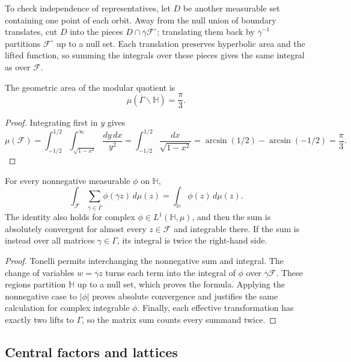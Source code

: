 To check independence of representatives, let $D$ be another measurable set containing one point of each orbit. Away from the null union of boundary translates, cut $D$ into the pieces $D\cap\overline\gamma\mathcal F^\circ$; translating them back by $\overline\gamma^{-1}$ partitions $\mathcal F^\circ$ up to a null set. Each translation preserves hyperbolic area and the lifted function, so summing the integrals over these pieces gives the same integral as over $\mathcal F$.

\begin{proposition}\label{modular.quotient-area}
The geometric area of the modular quotient is
\[
 \mu(\overline\Gamma\backslash\mathbb H)=\frac\pi3.
\]
\end{proposition}

\begin{proof}
Integrating first in $y$ gives
\[
 \mu(\mathcal F)=\int_{-1/2}^{1/2}\int_{\sqrt{1-x^2}}^\infty
       \frac{dy\,dx}{y^2}
 =\int_{-1/2}^{1/2}\frac{dx}{\sqrt{1-x^2}}
 =\arcsin(1/2)-\arcsin(-1/2)=\frac\pi3.
\]
\end{proof}

\begin{proposition}\label{modular.area-unfolding}
For every nonnegative measurable $\phi$ on $\mathbb H$,
\[
 \int_{\mathcal F}\sum_{\overline\gamma\in\overline\Gamma}
       \phi(\overline\gamma z)\,d\mu(z)
 =\int_{\mathbb H}\phi(z)\,d\mu(z).
\]
The identity also holds for complex $\phi\in L^1(\mathbb H,\mu)$, and then the sum is absolutely convergent for almost every $z\in\mathcal F$ and integrable there. If the sum is instead over all matrices $\gamma\in\Gamma$, its integral is twice the right-hand side.
\end{proposition}

\begin{proof}
Tonelli permits interchanging the nonnegative sum and integral. The change of variables $w=\overline\gamma z$ turns each term into the integral of $\phi$ over $\overline\gamma\mathcal F$. These regions partition $\mathbb H$ up to a null set, which proves the formula. Applying the nonnegative case to $|\phi|$ proves absolute convergence and justifies the same calculation for complex integrable $\phi$. Finally, each effective transformation has exactly two lifts to $\Gamma$, so the matrix sum counts every summand twice.
\end{proof}

\subsection*{Central factors and lattices}\label{modular.central-factors}

